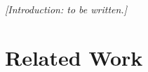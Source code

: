 \documentclass{article}
\begin{document}

\noindent\textcolor{gray!80}{\itshape[Introduction: to be written.]}

\section{Related Work}
\label{sec:related}
\end{document}
